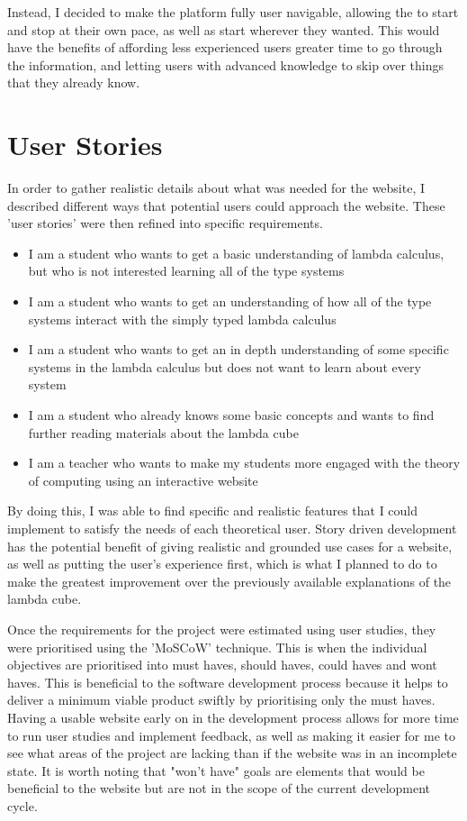 \documentclass{l4proj}
\begin{document}
Instead, I decided to make the platform fully user navigable, allowing the to start and stop at their own pace, as well as start wherever they wanted.  This would have the benefits of affording less experienced users greater time to go through the information, and letting users with advanced knowledge to skip over things that they already know.

\section{User Stories}
In order to gather realistic details about what was needed for the website, I described different ways that potential users could approach the website.  These 'user stories' were then refined into specific requirements.

\begin{itemize}
    \item 
        I am a student who wants to get a basic understanding of lambda calculus, but who is not interested learning all of the type systems

    \item
        I am a student who wants to get an understanding of how all of the type systems interact with the simply typed lambda calculus

    \item
        I am a student who wants to get an in depth understanding of some specific systems in the lambda calculus but does not want to learn about every system

    \item
        I am a student who already knows some basic concepts and wants to find further reading materials about the lambda cube
    \item 
        I am a teacher who wants to make my students more engaged with the theory of computing using an interactive website
\end{itemize}

By doing this, I was able to find specific and realistic features that I could implement to satisfy the needs of each theoretical user.  Story driven development has the potential benefit of giving realistic and grounded use cases for a website, as well as putting the user's experience first, which is what I planned to do to make the greatest improvement over the previously available explanations of the lambda cube. 

Once the requirements for the project were estimated using user studies, they were prioritised using the 'MoSCoW' technique.  This is when the individual objectives are prioritised into must haves, should haves, could haves and wont haves.  This is beneficial to the software development process because it helps to deliver a minimum viable product swiftly by prioritising only the must haves.  Having a usable website early on in the development process allows for more time to run user studies and implement feedback, as well as making it easier for me to see what areas of the project are lacking than if the website was in an incomplete state.  It is worth noting that "won't have" goals are elements that would be beneficial to the website but are not in the scope of the current development cycle.
\end{document}
